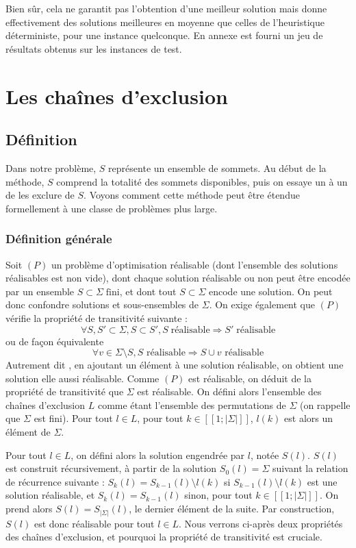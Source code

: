 \documentclass[12pt,a4paper]{article}
\begin{document}
Bien sûr, cela ne garantit pas l'obtention d'une meilleur solution mais donne effectivement des solutions meilleures en moyenne que celles de l'heuristique déterministe, pour une instance quelconque. En annexe est fourni un jeu de résultats obtenus sur les instances de test.


\section{Les chaînes d'exclusion}
\subsection{Définition}
Dans notre problème, $S$ représente un ensemble de sommets. Au début de la méthode, $S$ comprend la totalité des sommets disponibles, puis on essaye un à un de les exclure de $S$. Voyons comment cette méthode peut être étendue formellement à une classe de problèmes plus large.

\subsubsection{Définition générale}
Soit $(P)$ un problème d'optimisation réalisable (dont l'ensemble des solutions réalisables est non vide), dont chaque solution réalisable ou non peut être encodée par un ensemble $S\subset \Sigma \;\text{fini}$, et dont tout $S\subset \Sigma$ encode une solution. On peut donc confondre solutions et sous-ensembles de $\Sigma$. On exige également que $(P)$  vérifie la propriété de transitivité suivante :
\[\forall S,S'\subset \Sigma,S\subset S',S \;\text{réalisable} \Rightarrow  S'\;\text{réalisable}\]
ou de façon équivalente
\[\forall v \in \Sigma\setminus S, S \text{ réalisable} \Rightarrow S\cup v \text{ réalisable} \]
Autrement dit , en ajoutant un élément à une solution réalisable, on obtient une solution elle aussi réalisable. Comme $(P)$ est réalisable, on déduit de la propriété de transitivité que $\Sigma$ est réalisable. On défini alors l'ensemble des chaînes d'exclusion $L$ comme étant l'ensemble des permutations de $\Sigma$ (on rappelle que $\Sigma$ est fini). Pour tout $l\in L$, pour tout $k\in[\![1;|\Sigma |]\!]$, $l(k)$ est alors un élément de $\Sigma$.

Pour tout $l\in L$, on défini alors la solution engendrée par $l$, notée $S(l)$. $S(l)$ est construit récursivement, à partir de la solution $S_0(l)=\Sigma$ suivant la relation de récurrence suivante : $S_{k}(l)=S_{k-1}(l)\setminus l(k)$ si $S_{k-1}(l)\setminus l(k)$ est une solution réalisable, et $S_{k}(l)=S_{k-1}(l)$ sinon, pour tout $k\in[\![1;|\Sigma |]\!]$. On prend alors $S(l)=S_{|\Sigma |}(l)$, le dernier élément de la suite. Par construction, $S(l)$ est donc réalisable pour tout $l\in L$. Nous verrons ci-après deux propriétés des chaînes d'exclusion, et pourquoi la propriété de transitivité est cruciale.  
\end{document}
